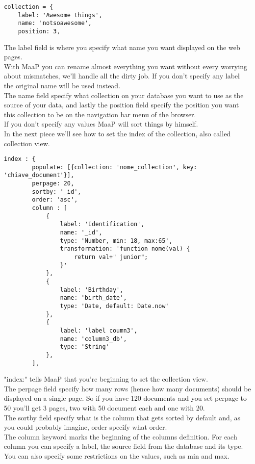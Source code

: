 \begin{lstlisting}
collection = {
	label: 'Awesome things',
	name: 'notsoawesome',
	position: 3,
\end{lstlisting}

The label field is where you specify what name you want displayed on the web pages.\\
With MaaP you can rename almost everything you want without every worrying about mismatches, we'll handle all the dirty job.
If you don't specify any label the original name will be used instead.\\
The name field specify what collection on your database you want to use as the source of your data, and lastly the position field specify the position you want this collection to be on the navigation bar menu of the browser.\\
If you don't specify any values MaaP will sort things by himself.\\

In the next piece we'll see how to set the index of the collection, also called collection view.\\

\begin{lstlisting}
index : {
		populate: [{collection: 'nome_collection', key: 'chiave_document'}],
		perpage: 20,
		sortby: '_id',
		order: 'asc',
		column : [
			{
				label: 'Identification',
				name: '_id',
				type: 'Number, min: 18, max:65',
				transformation: 'function nome(val) { 	
					return val+" junior";				
				}'
			},
			{	
				label: 'Birthday',
				name: 'birth_date',
				type: 'Date, default: Date.now'
			},
			{	
				label: 'label coumn3',
				name: 'column3_db',
				type: 'String'
			},
		],
\end{lstlisting}

"index:" tells MaaP that you're beginning to set the collection view.\\
The perpage field specify how many rows (hence how many documents) should be displayed on a single page. So if you have 120 documents and you set perpage to 50 you'll get 3 pages, two with 50 document each and one with 20.\\
The sortby field specify what is the column that gets sorted by default and, as you could probably imagine, order specify what order.\\

The column keyword marks the beginning of the columns definition.
For each column you can specify a label, the source field from the database and its type.
You can also specify some restrictions on the values, such as min and max.\\

